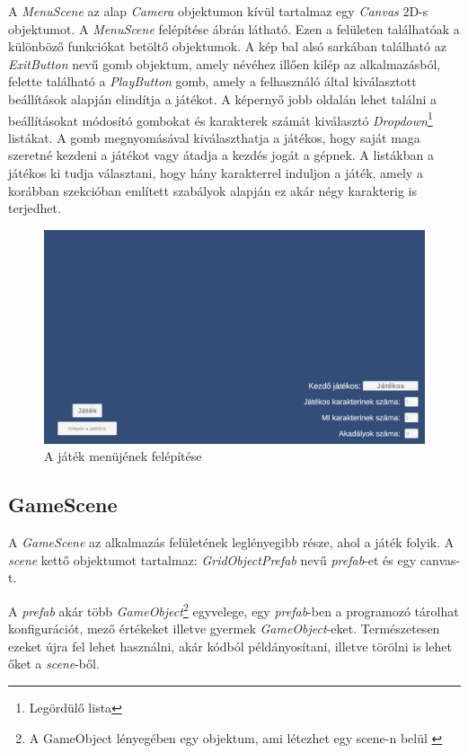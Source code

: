 \documentclass[
]{thesis-ekf}
\theoremstyle{definition}
\theoremstyle{remark}
\begin{document}
A \emph{MenuScene} az alap \emph{Camera} objektumon kívül tartalmaz egy \emph{Canvas} 2D-s objektumot. A \emph{MenuScene} felépítése  ábrán látható. Ezen a felületen találhatóak a különböző funkciókat betöltő objektumok. A kép bal alsó sarkában található az \emph{ExitButton} nevű gomb objektum, amely névéhez illően kilép az alkalmazásból, felette található a \emph{PlayButton} gomb, amely a felhasználó által kiválasztott beállítások alapján elindítja a játékot. A képernyő jobb oldalán lehet találni a beállításokat módosító gombokat és karakterek számát kiválasztó \emph{Dropdown}\footnote{Legördülő lista} listákat. A gomb megnyomásával kiválaszthatja a játékos, hogy saját maga szeretné kezdeni a játékot vagy átadja a kezdés jogát a gépnek. A listákban a játékos ki tudja választani, hogy hány karakterrel induljon a játék, amely a korábban  szekcióban említett szabályok alapján ez akár négy karakterig is terjedhet. 

\begin{figure}[h!]
	\centering
	\includegraphics[width=15cm]{./pictures/game_menu.png}
	\caption{A játék menüjének felépítése}
	\label{menuscene}
\end{figure}

\subsection{GameScene}

A \emph{GameScene} az alkalmazás felületének leglényegibb része, ahol a játék folyik. A \emph{scene} kettő objektumot tartalmaz: \emph{GridObjectPrefab} nevű \emph{prefab}-et és egy canvas-t. 

A \emph{prefab} akár több \emph{GameObject}\footnote{A GameObject lényegében egy objektum, ami létezhet egy scene-n belül \cite{UnityDocsGameObject}} egyvelege, egy \emph{prefab}-ben a programozó tárolhat konfigurációt, mező értékeket illetve gyermek \emph{GameObject}-eket. Természetesen ezeket újra fel lehet használni, akár kódból példányosítani, illetve törölni is lehet őket a \emph{scene}-ből. \cite{UnityDocsPrefab} 
\end{document}

